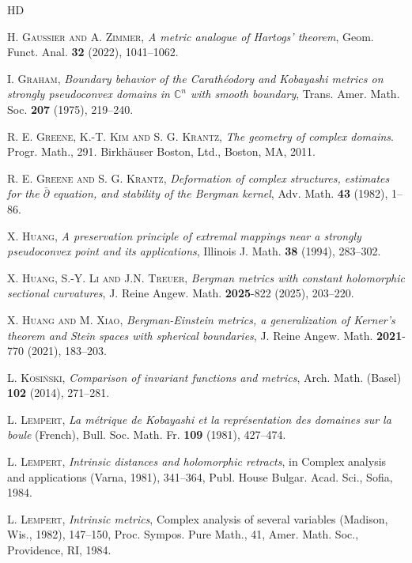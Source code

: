 \documentclass[12pt] {article}
\numberwithin{equation}{section}
\begin{document}
\begin{thebibliography}{HD}
{ \textsc{H. Gaussier and A. Zimmer}, \emph{A metric analogue of Hartogs' theorem}, Geom. Funct. Anal. {\bf 32} (2022), 1041--1062.

 \textsc{I. Graham}, \emph{Boundary behavior of the Carath\'eodory and Kobayashi metrics on strongly pseudoconvex domains in $\mathbb{C}^n$ with smooth boundary}, Trans. Amer. Math. Soc. {\bf 207} (1975), 219--240.


 \textsc{R. E. Greene, K.-T. Kim and S. G. Krantz},  \emph{The geometry of complex domains}. Progr. Math., 291. Birkh{\" a}user Boston, Ltd., Boston, MA, 2011.  


 
 \textsc{R. E. Greene and S. G. Krantz}, \emph{Deformation of complex structures, estimates for the $\bar\partial$ equation, and stability of the Bergman kernel}, Adv. Math.  {\bf 43} (1982), 1--86.

 

 \textsc{X. Huang}, \emph{A preservation principle of extremal mappings near a strongly pseudoconvex point and its applications}, Illinois J. Math. {\bf 38} (1994), 283--302.

 \textsc{X. Huang, S.-Y. Li and J.N. Treuer}, \emph{Bergman metrics with constant holomorphic sectional curvatures}, J. Reine Angew. Math.  {\bf 2025}-822 (2025), 203--220.


 \textsc{X. Huang and M. Xiao}, \emph{Bergman-Einstein metrics, a generalization of Kerner's theorem and Stein spaces with spherical boundaries}, J. Reine Angew. Math. {\bf 2021}-770 (2021), 183--203.

 \textsc{L. Kosi{\'n}ski}, \emph{Comparison of invariant functions and metrics}, Arch. Math. (Basel) {\bf 102} (2014), 271--281.

 \textsc{L. Lempert}, \emph{La m{\'e}trique de {Kobayashi} et la repr{\'e}sentation des domaines sur la boule} (French), Bull. Soc. Math. Fr. {\bf 109} (1981), 427--474.


 \textsc{L. Lempert}, \emph{Intrinsic distances and holomorphic retracts}, in Complex analysis and
applications (Varna, 1981), 341--364, Publ. House Bulgar. Acad.
Sci., Sofia, 1984.


 \textsc{L. Lempert}, \emph{Intrinsic metrics}, Complex analysis of several variables (Madison, Wis., 1982), 147--150, Proc. Sympos. Pure Math., 41, Amer. Math. Soc., Providence, RI, 1984.



}
\end{thebibliography}
\end{document}
